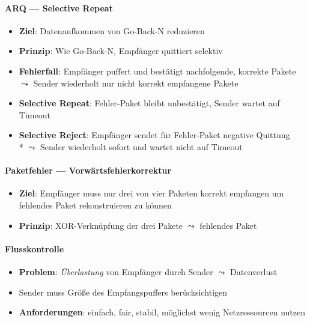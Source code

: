 \paragraph{ARQ --- Selective Repeat}
\begin{itemize}
  \item \textbf{Ziel}: Datenaufkommen von Go-Back-N reduzieren
  \item \textbf{Prinzip}: Wie Go-Back-N, Empfänger quittiert selektiv
  \item \textbf{Fehlerfall}: Empfänger puffert und bestätigt nachfolgende, korrekte Pakete \( \leadsto \) Sender wiederholt nur nicht korrekt empfangene Pakete
  \item \textbf{Selective Repeat}: Fehler-Paket bleibt unbestätigt, Sender wartet auf Timeout
  \item \textbf{Selective Reject}: Empfänger sendet für Fehler-Paket negative Quittung \\* \( \leadsto \) Sender wiederholt sofort und wartet nicht auf Timeout
\end{itemize}

\paragraph{Paketfehler --- Vorwärtsfehlerkorrektur}
\begin{itemize}
  \item \textbf{Ziel}: Empfänger muss nur drei von vier Paketen korrekt empfangen um fehlendes Paket rekonstruieren zu können
  \item \textbf{Prinzip}: XOR-Verknüpfung der drei Pakete \( \leadsto \) fehlendes Paket
\end{itemize}

\paragraph{Flusskontrolle}
\begin{itemize}
  \item \textbf{Problem}: \emph{Überlastung} von Empfänger durch Sender \( \leadsto \) Datenverlust
   \item Sender muss Größe des Empfangspuffers berücksichtigen
  \item \textbf{Anforderungen}: einfach, fair, stabil, möglichst wenig Netzressourcen nutzen
\end{itemize}

